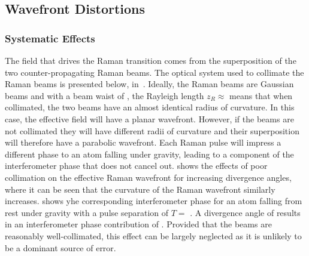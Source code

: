 \subsection{Wavefront Distortions}\label{subsec:fringe_wavefront}
\subsubsection{Systematic Effects}
The field that drives the Raman transition comes from the
superposition of the two counter-propagating Raman beams. The optical
system used to collimate the Raman beams is presented below,
in~. Ideally,
the Raman beams are Gaussian beams and with a beam
waist of , the Rayleigh length $z_R \approx
$  means that when collimated, the two beams have an
almost identical radius of curvature. In this case, the effective field will have a planar wavefront.
However, if the beams are not collimated they will have different
radii of curvature and their superposition will therefore
have a parabolic wavefront. Each Raman pulse will impress a different
phase to an atom falling under gravity, leading to a component of the
interferometer phase that does not cancel out.
 shows the effects of poor
collimation on the effective Raman wavefront for increasing divergence
angles, where it can be seen that the curvature of the Raman wavefront
similarly increases.  shows yhe corresponding interferometer phase for an
atom falling from rest under gravity with a pulse separation of $T=$
. A divergence angle of
 results in an interferometer phase
contribution of .  
Provided that the beams are reasonably
well-collimated, this effect can be largely neglected as it is
unlikely to be a dominant source of error. 
